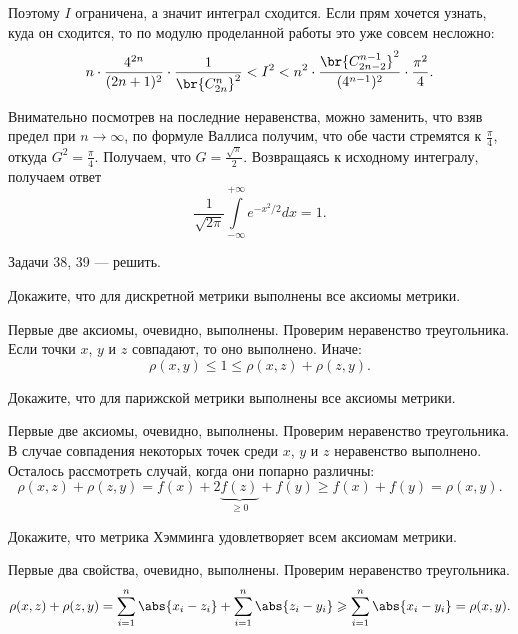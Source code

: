 \begin{solution}
    Поэтому $I$ ограничена, а значит интеграл сходится. Если прям хочется узнать, куда он сходится, то по модулю проделанной работы это уже совсем несложно:
    \[
        n \cdot \frac{4^{2n}}{(2n + 1)^2} \cdot \frac{1}{\br{C_{2n}^n}^2} < I^2 < n^2 \cdot \frac{\br{C_{2n - 2}^{n - 1}}^2}{(4^{n - 1})^2} \cdot \frac{\pi^2}{4}.
    \]

    Внимательно посмотрев на последние неравенства, можно заменить, что взяв предел при $n \to \infty$, по формуле Валлиса получим, что обе части стремятся к $\frac{\pi}{4}$, откуда $G^2 = \frac{\pi}{4}$. Получаем, что $G = \frac{\sqrt{\pi}}{2}$. Возвращаясь к исходному интегралу, получаем ответ
    \[
        \frac{1}{\sqrt{2\pi}}\int\limits_{-\infty}^{+\infty}e^{-x^2 / 2}dx = 1.
    \]
\end{solution}

Задачи 38, 39 --- решить.

\begin{problem}[40$^\circ$]
    Докажите, что для дискретной метрики выполнены все аксиомы метрики.
\end{problem}

\begin{solution}
    Первые две аксиомы, очевидно, выполнены. Проверим неравенство треугольника. Если точки $x$, $y$ и $z$ совпадают, то оно выполнено. Иначе:
    \[
        \rho(x, y) \leqslant 1 \leqslant \rho(x, z) + \rho(z, y).
    \]
\end{solution}

\begin{problem}[41$^\circ$]
    Докажите, что для парижской метрики выполнены все аксиомы метрики.
\end{problem}

\begin{solution}
    Первые две аксиомы, очевидно, выполнены. Проверим неравенство треугольника. В случае совпадения некоторых точек среди $x$, $y$ и $z$ неравенство выполнено. Осталось рассмотреть случай, когда они попарно различны:
    \[
        \rho(x, z) + \rho(z, y) = f(x) + 2\underbrace{f(z)}_{\geqslant 0} + f(y) \geqslant f(x) + f(y) = \rho(x, y).
    \]
\end{solution}

\begin{problem}[42$^\circ$]
    Докажите, что метрика Хэмминга удовлетворяет всем аксиомам метрики.
\end{problem}

\begin{solution}
    Первые два свойства, очевидно, выполнены. Проверим неравенство треугольника.
    \[
        \rho(x, z) + \rho(z, y) = \sum_{i = 1}^n\abs{x_i - z_i} + \sum_{i = 1}^n\abs{z_i - y_i} \geqslant \sum_{i = 1}^n\abs{x_i - y_i} = \rho(x, y).
    \]
\end{solution}


